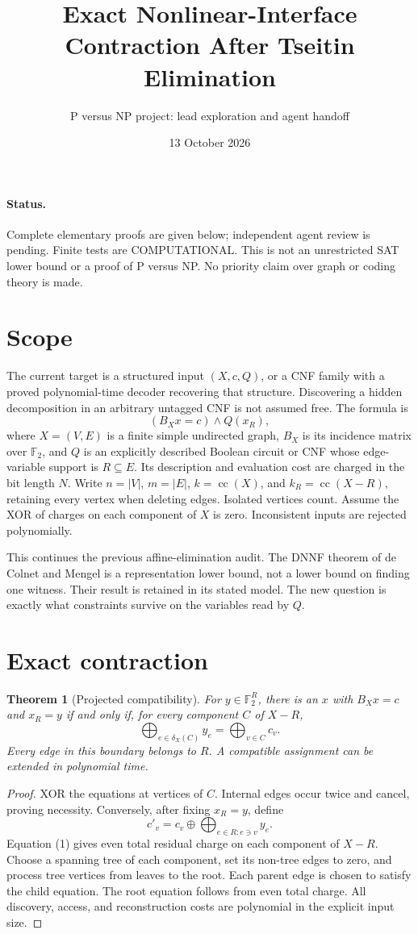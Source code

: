 \documentclass[11pt]{article}
\newtheorem{theorem}{Theorem}
\newcommand{\F}{\mathbb F_2}
\newcommand{\cc}{\operatorname{cc}}
\begin{document}
\title{Exact Nonlinear-Interface Contraction After Tseitin Elimination}
\author{P versus NP project: lead exploration and agent handoff}
\date{13 October 2026}
\maketitle
\paragraph{Status.} Complete elementary proofs are given below; independent agent review is pending. Finite tests are COMPUTATIONAL. This is not an unrestricted SAT lower bound or a proof of P versus NP. No priority claim over graph or coding theory is made.
\section{Scope}
The current target is a structured input $(X,c,Q)$, or a CNF family with a proved polynomial-time decoder recovering that structure. Discovering a hidden decomposition in an arbitrary untagged CNF is not assumed free. The formula is
\[
(B_Xx=c)\land Q(x_R),
\]
where $X=(V,E)$ is a finite simple undirected graph, $B_X$ is its incidence matrix over $\F$, and $Q$ is an explicitly described Boolean circuit or CNF whose edge-variable support is $R\subseteq E$. Its description and evaluation cost are charged in the bit length $N$.
Write $n=|V|$, $m=|E|$, $k=\cc(X)$, and $k_R=\cc(X-R)$, retaining every vertex when deleting edges. Isolated vertices count. Assume the XOR of charges on each component of $X$ is zero. Inconsistent inputs are rejected polynomially.

This continues the previous affine-elimination audit. The DNNF theorem of de Colnet and Mengel is a representation lower bound, not a lower bound on finding one witness. Their result is retained in its stated model. The new question is exactly what constraints survive on the variables read by $Q$.
\section{Exact contraction}
\begin{theorem}[Projected compatibility]
For $y\in\F^R$, there is an $x$ with $B_Xx=c$ and $x_R=y$ if and only if, for every component $C$ of $X-R$,
\[
\bigoplus_{e\in\delta_X(C)}y_e
=
\bigoplus_{v\in C}c_v. \tag{1}
\]
Every edge in this boundary belongs to $R$. A compatible assignment can be extended in polynomial time.
\end{theorem}
\begin{proof}
XOR the equations at vertices of $C$. Internal edges occur twice and cancel, proving necessity. Conversely, after fixing $x_R=y$, define
\[
c'_v=c_v\oplus\bigoplus_{e\in R:e\ni v}y_e.
\]
Equation (1) gives even total residual charge on each component of $X-R$. Choose a spanning tree of each component, set its non-tree edges to zero, and process tree vertices from leaves to the root. Each parent edge is chosen to satisfy the child equation. The root equation follows from even total charge. All discovery, access, and reconstruction costs are polynomial in the explicit input size.
\end{proof}
\end{document}
